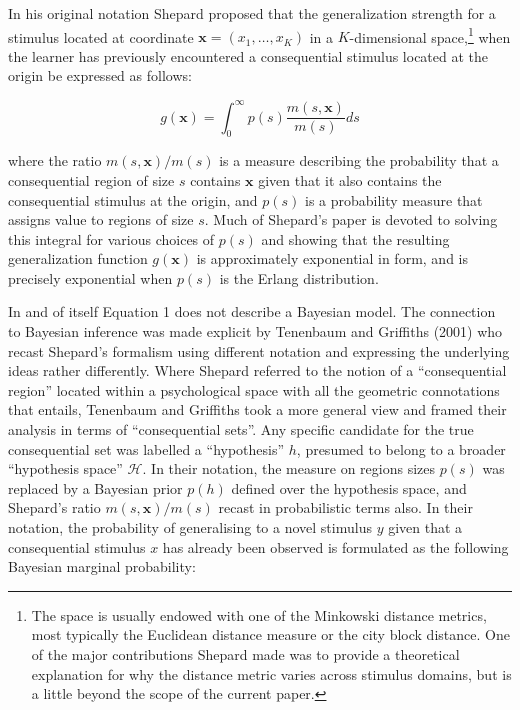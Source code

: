\documentclass[english,doc]{apa6}
\begin{document}
In his original notation Shepard proposed that the generalization strength for a stimulus located at coordinate \(\mathbf{x} = (x_1, \ldots, x_K)\) in a \(K\)-dimensional space,\footnote{The space is usually endowed with one of the Minkowski distance metrics, most typically the Euclidean distance measure or the city block distance. One of the major contributions Shepard made was to provide a theoretical explanation for why the distance metric varies across stimulus domains, but is a little beyond the scope of the current paper.} when the learner has previously encountered a consequential stimulus located at the origin be expressed as follows:

\begin{equation}
g(\mathbf{x}) = \int_0^\infty p(s) \frac{m(s, \mathbf{x})}{m(s)} ds
\end{equation}

\noindent
where the ratio \(m(s, \mathbf{x})/m(s)\) is a measure describing the probability that a consequential region of size \(s\) contains \(\mathbf{x}\) given that it also contains the consequential stimulus at the origin, and \(p(s)\) is a probability measure that assigns value to regions of size \(s\). Much of Shepard's paper is devoted to solving this integral for various choices of \(p(s)\) and showing that the resulting generalization function \(g(\mathbf{x})\) is approximately exponential in form, and is precisely exponential when \(p(s)\) is the Erlang distribution.

In and of itself Equation 1 does not describe a Bayesian model. The connection to Bayesian inference was made explicit by Tenenbaum and Griffiths (2001) who recast Shepard's formalism using different notation and expressing the underlying ideas rather differently. Where Shepard referred to the notion of a \enquote{consequential region} located within a psychological space with all the geometric connotations that entails, Tenenbaum and Griffiths took a more general view and framed their analysis in terms of \enquote{consequential sets}. Any specific candidate for the true consequential set was labelled a \enquote{hypothesis} \(h\), presumed to belong to a broader \enquote{hypothesis space} \(\mathcal{H}\). In their notation, the measure on regions sizes \(p(s)\) was replaced by a Bayesian prior \(p(h)\) defined over the hypothesis space, and Shepard's ratio \(m(s, \mathbf{x})/m(s)\) recast in probabilistic terms also. In their notation, the probability of generalising to a novel stimulus \(y\) given that a consequential stimulus \(x\) has already been observed is formulated as the following Bayesian marginal probability:
\end{document}
